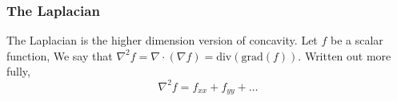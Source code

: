 \subsubsection{The Laplacian}
The Laplacian is the higher dimension version of concavity. Let $f$ be a scalar function, We say that $\nabla^2 f = \nabla \cdot (\nabla f) = \text{div} (\text{grad}(f))$. Written out more fully,
\begin{equation*}
	\nabla^2 f = f_{xx} + f_{yy} + \ldots
\end{equation*}